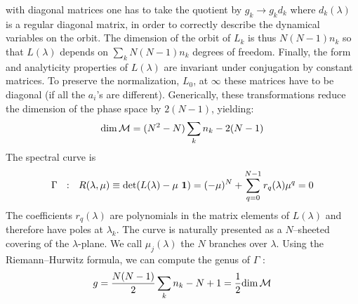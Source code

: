 \documentclass[a4paper,11pt]{article}
\begin{document}
with diagonal
matrices one has to take the quotient by $g_k\to g_k d_k$
where $d_k(\lambda )$ is a regular diagonal matrix, in order to
correctly describe the dynamical variables on the orbit. 
The dimension of the orbit of $L_k$ is thus $N(N-1)n_k$ so that
$L(\lambda )$ depends on $\sum_k N(N-1)n_k$ degrees of freedom. 
Finally, the form and analyticity properties of
$L(\lambda )$ are invariant under conjugation by constant matrices. To
preserve the normalization, $L_0$, at $\infty$ these matrices have to be diagonal
(if all the $a_i$'s are different).   Generically, these
transformations  reduce the dimension of the 
phase space  by $2(N-1)$, yielding:
$$
{\rm dim}\,{\cal M}=(N^2-N)\sum_k n_k -2(N-1)
$$
The spectral curve is
\begin{eqnarray}
\Gamma~~ :~~ R(\lambda, \mu ) \equiv \det( L(\lambda )-\mu~{\bf 1} )
=(-\mu)^N +\sum_{q=0}^{N-1} 
r_q(\lambda) \mu^q =0
\label{specurve2} 
\end{eqnarray}
The coefficients $r_q(\lambda)$ are polynomials in the matrix elements
of $L(\lambda )$ and therefore have poles at $\lambda _k$. The curve is naturally presented as a $N$--sheeted covering of the $\lambda$-plane. We call 
$\mu_j(\lambda)$ the $N$ branches over $\lambda$. Using the Riemann--Hurwitz
formula, we can compute the genus of  $\Gamma$ \cite{BaTa99}:
$$
g={N(N-1)\over 2}\sum_k n_k -N +1 = {1\over 2} {\rm dim}\,{\cal M}
$$
\end{document}
